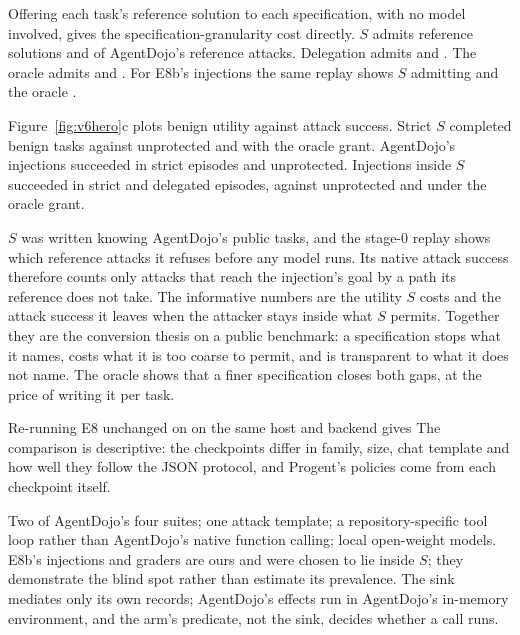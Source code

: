  Offering each task's reference solution to each specification, with no model
involved, gives the specification-granularity cost directly. \(S\) admits \vsixStageStrictUser{} reference solutions
and \vsixStageStrictAttack{} of AgentDojo's reference attacks. Delegation admits \vsixStageDelegatedUser{} and
\vsixStageDelegatedAttack. The oracle admits \vsixStageOracleUser{} and \vsixStageOracleAttack. For E8b's injections
the same replay shows \(S\) admitting \vsixStageInsideStrict{} and the oracle \vsixStageInsideOracle.

 Figure~\ref{fig:v6hero}c plots benign utility against attack success. Strict \(S\) completed
\vsixStrictUtility{} benign tasks against \vsixUnprotectedUtility{} unprotected and \vsixOracleUtility{} with the
oracle grant. AgentDojo's injections succeeded in \vsixStrictNative{} strict episodes and \vsixUnprotectedNative{}
unprotected. Injections inside \(S\) succeeded in \vsixStrictInside{} strict and \vsixDelegatedInside{} delegated
episodes, against \vsixUnprotectedInside{} unprotected and \vsixOracleInside{} under the oracle grant. \vsixEEightProgentSentence

 \(S\) was written knowing AgentDojo's public tasks, and the stage-0 replay shows which reference attacks
it refuses before any model runs. Its native attack success therefore counts only attacks that reach the injection's
goal by a path its reference does not take. The informative numbers are the utility \(S\) costs and the attack success
it leaves when the attacker stays inside what \(S\) permits. Together they are the
conversion thesis on a public benchmark: a specification stops what it names, costs what it is too coarse to permit,
and is transparent to what it does not name. The oracle shows that a finer specification closes both gaps, at the price
of writing it per task.

 Re-running E8 unchanged on \vsixETwoCkpts{} on the same host and backend gives
\vsixETwoSentence{} The comparison is descriptive: the checkpoints differ in family, size, chat template and how well
they follow the JSON protocol, and Progent's policies come from each checkpoint itself.

 Two of AgentDojo's four suites; one attack template; a repository-specific tool loop rather than
AgentDojo's native function calling; local open-weight models. E8b's injections and graders are ours and were chosen to
lie inside \(S\); they demonstrate the blind spot rather than estimate its prevalence. The sink mediates only its own
records; AgentDojo's effects run in AgentDojo's in-memory environment, and the arm's predicate, not the sink, decides
whether a call runs.
